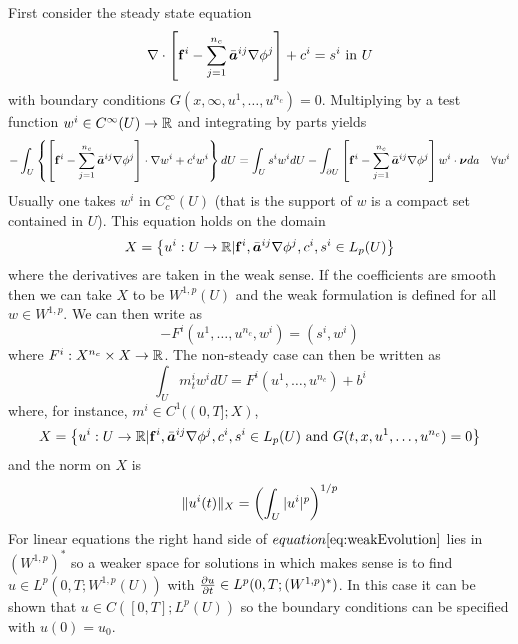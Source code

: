 \documentclass[10pt,dvips,twoside,reqno]{amsart}
\begin{document}
First consider the steady state equation
\begin{equation}
  \label{eq:steadyState}
  \nabla \cdot \left[ {\bf f}^i - \sum_{j=1}^{n_c} \bar{\mbox{{\boldmath ${a}$}}}^{ij} \nabla \phi^j \right] + c^i = s^i \mbox{ in } U 
\end{equation}
with boundary conditions $G(x,\infty,u^1,\ldots,u^{n_c}) = 0$.
Multiplying  by a test function $w^i \in
C^{\infty}(U) \rightarrow \mathbb{R}$ and integrating by parts yields
\begin{equation}
  \label{eq:weakSteadyState}
  -\int_{U} \left\{ \left[ {\bf f}^i - \sum_{j=1}^{n_c} \bar{\mbox{{\boldmath ${a}$}}}^{ij} \nabla \phi^j \right] \cdot \nabla w^i + c^iw^i \right\} dU = \int_{U} s^iw^i dU - \int_{\partial U} \left[ {\bf f}^i - \sum_{j=1}^{n_c} \bar{\mbox{{\boldmath ${a}$}}}^{ij} \nabla \phi^j \right] w^i \cdot \mbox{{\boldmath ${\nu}$}} da \quad \forall w^i
\end{equation}
Usually one takes $w^i$ in $C^{\infty}_c(U)$ (that is the support of $w$ is a compact set contained in $U$). This equation holds on the domain
\begin{equation}
  \label{eq:weakDomain}
  X = \left\{ u^i:U \rightarrow \mathbb{R} | {\bf f}^i, \bar{\mbox{{\boldmath ${a}$}}}^{ij} \nabla \phi^j, c^i, s^i \in L_p(U) \right\}
\end{equation}
where the derivatives are taken in the weak sense. If the coefficients
are smooth then we can take $X$ to be $W^{1,p}(U)$ and the weak
formulation is defined for all $w \in W^{1,p}$.  We can then write
 as
\begin{equation}
  \label{eq:conciseWeakSteadyState}
  -F^i(u^1,\ldots,u^{n_c},w^i) = (s^i,w^i)
\end{equation}
where $F^i:X^{n_c}\times X \rightarrow \mathbb{R}$. The non-steady case can then be
written as
\begin{equation}
  \label{eq:weakEvolution}
  \int_{U} m^i_t w^i dU = F^i(u^1,\ldots,u^{n_c}) + b^i  
\end{equation}
where, for instance, $m^i \in C^1((0,T];X)$,
\begin{equation}
  \label{eq:domainSemiGroup}
  X = \left\{ u^i:U \rightarrow \mathbb{R} | {\bf f}^i, \bar{\mbox{{\boldmath ${a}$}}}^{ij} \nabla \phi^j, c^i, s^i \in L_p(U) \mbox { and } G(t,x,u^1,\ldots,u^{n_c}) = 0\right\}
\end{equation}
and the norm on $X$ is
\begin{equation}
  \label{eq:Lpnorm}
  \| u^i(t) \|_X = \left( \int_U |u^i|^p \right)^{1/p} 
\end{equation}
For linear equations the right hand side of $\eqn{weakEvolution}$ lies
in $(W^{1,p})^*$ so a weaker space for solutions in which
 makes sense is to find $u \in L^p(0,T;W^{1,p}(U))$
with $\frac{\partial {u}}{\partial {t}} \in L^p(0,T;(W^{1,p})^*)$. In this case it can be
shown that $u \in C([0,T];L^p(U))$ so the boundary conditions can be
specified with $u(0) = u_0$.
 
\end{document}
